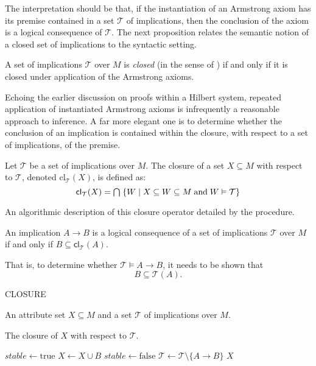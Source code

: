 The interpretation should be that, if the instantiation of an Armstrong axiom has its premise contained in a set $\mathcal{T}$
of implications, then the conclusion of the axiom is a logical consequence of $\mathcal{T}$. The next proposition relates
the semantic notion of a closed set of implications to the syntactic setting.

\begin{proposition}
	\label{proposition:armstrong-closed}

	A set of implications $\mathcal{T}$ over $M$ is \emph{closed} (in the sense of )
	if and only if it is closed under application of the Armstrong axioms.
\end{proposition}

Echoing the earlier discussion on proofs within a Hilbert system, repeated application of instantiated Armstrong axioms is
infrequently a reasonable approach to inference. A far more elegant one is to determine whether the conclusion of an
implication is contained within the closure, with respect to a set of implications, of the premise.

\begin{definition}
	\label{definition:closure-operator-implications}

	Let $\mathcal{T}$ be a set of implications over $M$. The closure of a set $X \subseteq M$ with respect to $\mathcal{T}$,
	denoted $\text{cl}_{\mathcal{T}}(X)$, is defined as:
	\[
		\mathsf{cl}_{\mathcal{T}}(X) = \bigcap \; \{W \mid X \subseteq W \subseteq M \tand W \vDash \mathcal{T}\}
	\]
\end{definition}

An algorithmic description of this closure operator detailed by the  procedure.

\begin{proposition}
	\label{proposition:} An implication $A \rightarrow B$ is a logical consequence of a set of implications $\mathcal{T}$ over
	$M$ if and only if $B \subseteq \mathsf{cl}_{\mathcal{T}}(A)$.
\end{proposition}

That is, to determine whether $\mathcal{T}\vDash A \rightarrow B$, it needs to be shown that
\[
	B \subseteq \mathcal{T}(A).
\]

\begin{algo}
	{CLOSURE}

	\label{algorithm:Closure}

	\Require An attribute set $X\subseteq M$ and a set $\mathcal{T}$ of implications over $M$.

	\Ensure The closure of $X$ with respect to $\mathcal{T}$.

	\Repeat \State $stable \gets \text{true}$   \State $X \gets X \cup
	B$ \State $stable \gets \text{false}$ \State $\mathcal{T}\gets \mathcal{T}\setminus \{A \to B\}$ \EndIf \EndFor {}
	\State \Return $X$
\end{algo}

